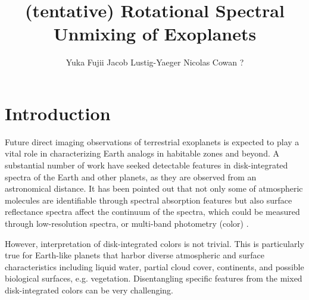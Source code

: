\documentclass[iop,numberedappendix,apj,]{emulateapj}
\begin{document}
\title{(tentative) Rotational Spectral Unmixing of Exoplanets}


\author{
%
Yuka Fujii 
%
Jacob Lustig-Yaeger 
%
Nicolas Cowan ? 
%
}

      
  
  



\vspace{0.5\baselineskip}


\begin{abstract}

\end{abstract}

  



\section{Introduction}
\label{sec:intro}

Future direct imaging observations of terrestrial exoplanets is expected to play a vital role in characterizing Earth analogs in habitable zones and beyond. 
A substantial number of work have seeked detectable features in disk-integrated spectra of the Earth and other planets, as they are observed from an astronomical distance. 
It has been pointed out that not only some of atmospheric molecules are identifiable through spectral absorption features \citep[e.g.,][]{DesMarais2002} but also surface reflectance spectra affect the continuum of the spectra, which could be measured through low-resolution spectra, or multi-band photometry (color) \citep[e.g.,][]{Ford2001}. 

However, interpretation of disk-integrated colors is not trivial. 
This is particularly true for Earth-like planets that harbor diverse atmospheric and surface characteristics including liquid water, partial cloud cover, continents, and possible biological surfaces, e.g. vegetation. 
Disentangling specific features from the mixed disk-integrated colors can be very challenging. 
\end{document}
